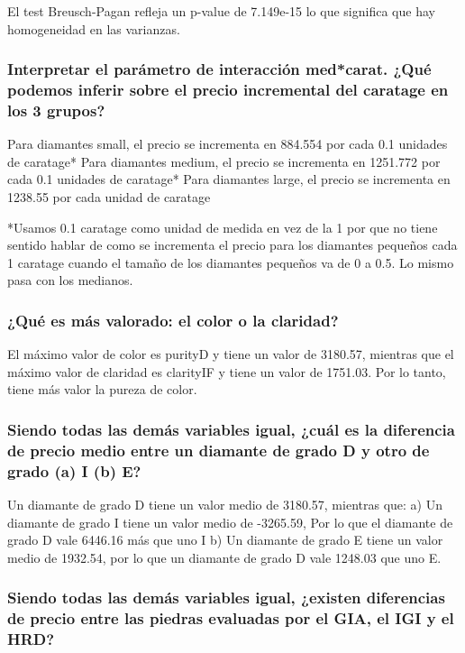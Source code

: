 \documentclass[a4paper, 9pt]{article}
\begin{document}
El test Breusch-Pagan refleja un p-value de 7.149e-15 lo que significa que hay homogeneidad en las varianzas.

\subsubsection{Interpretar el parámetro de interacción med*carat. ¿Qué podemos inferir sobre el precio incremental del caratage en los 3 grupos?}

Para diamantes small, el precio se incrementa en 884.554 por cada 0.1 unidades de caratage*
Para diamantes medium, el precio se incrementa en 1251.772 por cada 0.1 unidades de caratage*
Para diamantes large, el precio se incrementa en 1238.55 por cada unidad de caratage

*Usamos 0.1 caratage como unidad de medida en vez de la 1 por que no tiene sentido hablar de como se incrementa el precio para los diamantes pequeños cada 1 caratage cuando el tamaño de los diamantes pequeños va de 0 a 0.5. Lo mismo pasa con los medianos.


\subsubsection{¿Qué es más valorado: el color o la claridad? }
El máximo valor de color es purityD y tiene un valor de 3180.57, mientras que el máximo valor de claridad es clarityIF y tiene un valor de 1751.03. Por lo tanto, tiene más valor la pureza de color.

\subsubsection{Siendo todas las demás variables igual, ¿cuál es la diferencia de precio medio entre un diamante de grado D y otro de grado (a) I (b) E? }

Un diamante de grado D tiene un valor medio de 3180.57, mientras que:
a) Un diamante de grado I tiene un valor medio de -3265.59, Por lo que el diamante de grado D vale 6446.16 más que uno I
b) Un diamante de grado E tiene un valor medio de 1932.54, por lo que un diamante de grado D vale 1248.03 que uno E.

\subsubsection{Siendo todas las demás variables igual, ¿existen diferencias de precio entre las piedras evaluadas por el GIA, el IGI y el HRD? }
\end{document}
